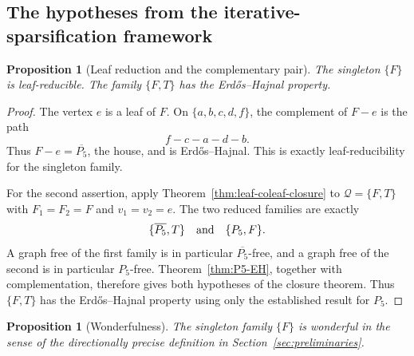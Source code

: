 \documentclass[11pt]{article}
\numberwithin{equation}{section}
\theoremstyle{plain}
\newtheorem{proposition}[theorem]{Proposition}
\theoremstyle{definition}
\begin{document}
\subsection{The hypotheses from the iterative-sparsification framework}

\begin{proposition}[Leaf reduction and the complementary pair]
\label{prop:f124-leaf-pair}
The singleton $\{F\}$ is leaf-reducible.  The family $\{F,T\}$ has the
Erd\H{o}s--Hajnal property.
\end{proposition}

\begin{proof}
The vertex $e$ is a leaf of $F$.  On $\{a,b,c,d,f\}$, the complement of
$F-e$ is the path
\[
                         f-c-a-d-b.
\]
Thus $F-e=\overline{P_5}$, the house, and is Erd\H{o}s--Hajnal.  This is
exactly leaf-reducibility for the singleton family.

For the second assertion, apply
Theorem~\ref{thm:leaf-coleaf-closure} to
$\mathcal Q=\{F,T\}$ with $F_1=F_2=F$ and $v_1=v_2=e$.  The two
reduced families are exactly
\[
                  \{\overline{P_5},T\}
       \quad\hbox{and}\quad
                  \{P_5,F\}.
\]
A graph free of the first family is in particular
$\overline{P_5}$-free, and a graph free of the second is in particular
$P_5$-free.  Theorem~\ref{thm:P5-EH}, together with complementation,
therefore gives both hypotheses of the closure theorem.  Thus
$\{F,T\}$ has the Erd\H{o}s--Hajnal property using only the established
result for $P_5$.
\end{proof}

\begin{proposition}[Wonderfulness]
\label{prop:f124-wonderful}
The singleton family $\{F\}$ is wonderful in the sense of
the directionally precise definition in Section~\ref{sec:preliminaries}.
\end{proposition}
\end{document}
